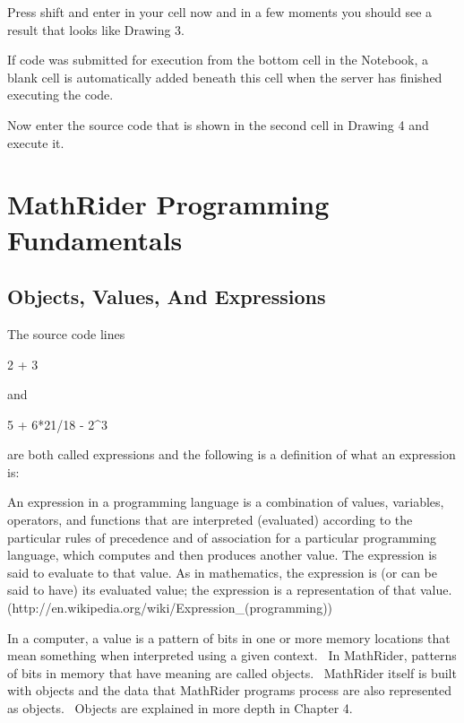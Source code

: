 \documentclass[12pt,twoside]{book}
\begin{document}
\bigskip

Press shift and enter in your cell now and in a few moments you should
see a result that looks like Drawing 3.


\bigskip

If code was submitted for execution from the bottom cell in the
Notebook, a blank cell is automatically added beneath this cell when
the server has finished executing the code.


\bigskip

Now enter the source code that is shown in the second cell in Drawing 4
and execute it.




\bigskip

\chapter[MathRider Programming Fundamentals]{MathRider
Programming Fundamentals}
\section[Objects, Values, And Expressions]{Objects,
Values, And Expressions}
The source code lines


\bigskip

2 + 3 


\bigskip

and 


\bigskip

5 + 6*21/18 {}- 2\^{}3


\bigskip

are both called expressions and the following is a definition of what an
expression is:


\bigskip

An expression in a programming language is a combination of values,
variables, operators, and functions that are interpreted (evaluated)
according to the particular rules of precedence and of association for
a particular programming language, which computes and then produces
another value. The expression is said to evaluate to that value. As in
mathematics, the expression is (or can be said to have) its evaluated
value; the expression is a representation of that value.
(http://en.wikipedia.org/wiki/Expression\_(programming))


\bigskip

In a computer, a value is a pattern of bits in one or more memory
locations that mean something when interpreted using a given context.
\ In MathRider, patterns of bits in memory that have meaning are called
objects. \ MathRider itself is built with objects and the data that
MathRider programs process are also represented as objects. \ Objects
are explained in more depth in Chapter 4.
\end{document}
